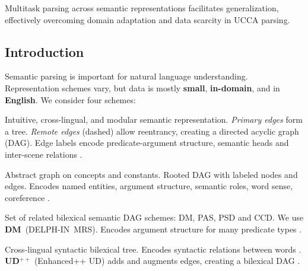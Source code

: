 \documentclass[a0,portrait]{a0poster}
\begin{document}
\vspace{1cm}
\titlespacing*{\section}{0pt}{8mm}{5mm}



\begin{adjustbox}{margin=3mm,frame,minipage=.6\linewidth,center}
\Large\color{Navy}
Multitask parsing across semantic representations facilitates generalization,
effectively overcoming domain adaptation and data scarcity in UCCA parsing.
\end{adjustbox}


\begin{multicols}{2}


\color{Black}

\section*{Introduction}

Semantic parsing is important for natural language understanding.
Representation schemes vary,
but data is mostly \textbf{small}, \textbf{in-domain}, and in \textbf{English}.
\hfill We consider four schemes:
\begin{itemize}[nosep,labelsep=1em]
{\color{Indigo} \item[\textbf{UCCA}:] Intuitive, cross-lingual, and modular semantic representation.
    \textit{Primary edges} form a tree. \textit{Remote edges} (dashed) allow reentrancy,
    creating a directed acyclic graph (DAG).
    Edge labels encode predicate-argument structure, semantic heads and inter-scene relations
    \cite{abend2013universal}.}
{\color{DarkGreen} \item[\textbf{AMR}:] Abstract graph on concepts and constants.
    Rooted DAG with labeled nodes and edges.
    Encodes named entities, argument structure, semantic roles, word sense, coreference \cite{banarescu2013abstract}.}
{\color{DarkRed} \item[\textbf{SDP}:] Set of related bilexical semantic DAG schemes: DM, PAS, PSD and CCD.
    We use \textbf{DM}~(DELPH-IN~MRS).
    Encodes argument structure for many predicate types \cite{oepen2016towards}.}
{\color{DarkBlue} \item[\textbf{UD}:] Cross-lingual syntactic bilexical tree.
    Encodes syntactic relations between words \cite{nivre2016universal}. \\
    \textbf{UD$^{++}$} (Enhanced++ UD) adds and augments edges, creating a bilexical DAG
    \cite{SCHUSTER16.779}.}
\end{itemize}


\end{multicols}
\end{document}
